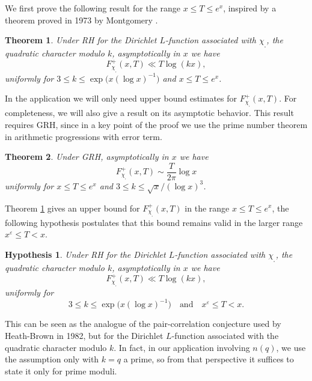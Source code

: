 \documentclass[pdflatex]{sn-jnl}%
\newcommand{\eps}{\ensuremath{\varepsilon}}
\theoremstyle{sltheorems}
\newtheorem{Thm}{Theorem}
\newtheorem{hypothesis}{Hypothesis}
\theoremstyle{plainrem}
\theoremstyle{definition}
\begin{document}
We first prove the following result for the range $x\le T \le e^x$, inspired by a
theorem  proved in 1973 by Montgomery \cite{Montgomery1973}.


\begin{Thm}\label{pc1chi}
Under RH for the Dirichlet $L$-function associated with $\chi_{_\square}$, the quadratic %
character
modulo $k$, asymptotically in $x$ we have
\[
F^+_{\chi_{_\square}}(x,T) 
\ll T \log (kx),
\]
uniformly for $3 \le k \le \exp\bigl(x (\log x)^{-1}\bigr)$
and $x \le T \le e^{x}$.
\end{Thm}

In the application we will only need upper bound estimates for $F^+_{\chi_{_\square}}(x,T)$.
For completeness, we will also give a result on its asymptotic behavior. 
This result requires GRH, since in a key point of the proof we use the 
prime number theorem in arithmetic progressions with error term.
\begin{Thm}\label{lam}
Under GRH, 
asymptotically in $x$ we have
\[
 F^+_{\chi_{_\square}}(x,T)  \sim \frac{T}{2\pi}\log x
 \]
uniformly for $ x \leq T \leq e^x$ and
$3\le k\le \sqrt{x}/(\log x)^{3}$.
\end{Thm}


\medskip 
Theorem \ref{pc1chi} gives an upper bound for $F^+_{\chi_{_\square}}(x,T)$  in
the range $x\le T \le e^x$,
the following hypothesis postulates that this bound remains valid in the 
larger range $x^\eps \le T < x$.

\begin{hypothesis}
\label{PCquadratic}
Under RH for the Dirichlet $L$-function associated with  $\chi_{_\square}$, the quadratic character
modulo $k$, asymptotically in $x$ we have
\[
F^+_{\chi_{_\square}}(x,T) 
\ll T \log (kx),
\]
uniformly for 
\[
3 \le k \le \exp\bigl(x (\log x)^{-1}\bigr)
 \quad\textrm{and} \quad
 x^{\eps} \le T < x.
  \]
\end{hypothesis}

This can be seen as the analogue of the pair-correlation conjecture used by Heath-Brown
\cite{HB1982} in 1982, but for the Dirichlet $L$-function associated with the
quadratic character modulo $k$.
In fact, in our application involving $n(q)$, we use the assumption only 
with $k=q$ a prime,
so from that perspective it suffices to state it only for prime moduli.
\end{document}
